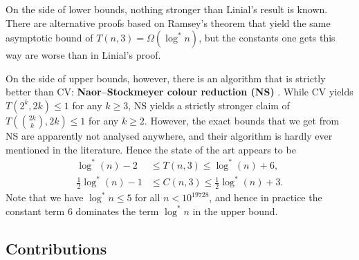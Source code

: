 \documentclass[a4paper,11pt]{article}
\theoremstyle{remark}
\newcommand{\logst}{\log^{*}}
\begin{document}
On the side of lower bounds, nothing stronger than Linial's result is known. There are alternative proofs based on Ramsey's theorem \cite{czygrinow08fast} that yield the same asymptotic bound of $T(n,3) = \Omega(\logst n)$, but the constants one gets this way are worse than in Linial's proof.

On the side of upper bounds, however, there is an algorithm that is strictly better than CV: \textbf{Naor--Stockmeyer colour reduction (NS)} \cite{naor95what}. While CV yields $T(2^k,2k) \le 1$ for any $k \ge 3$, NS yields a strictly stronger claim of $T(\binom{2k}{k},2k) \le 1$ for any $k \ge 2$. However, the exact bounds that we get from NS are apparently not analysed anywhere, and their algorithm is hardly ever mentioned in the literature. Hence the state of the art appears to be
\begin{align*}
    \logst(n) - 2 &\le T(n,3) \le \logst(n) + 6, \\
    \frac{1}{2}\logst(n) - 1 &\le C(n,3) \le \frac{1}{2}\logst(n) + 3.
\end{align*}
Note that we have $\logst n \le 5$ for all $n < 10^{19728}$, and hence in practice the constant term $6$ dominates the term $\logst n$ in the upper bound.


\subsection{Contributions}
\end{document}
